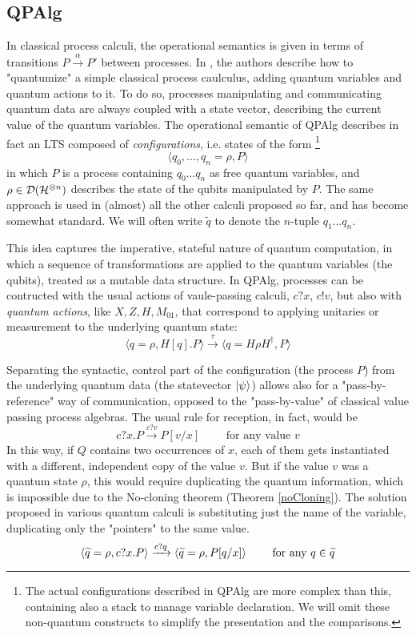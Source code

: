 \subsection{QPAlg}

In classical process calculi, the operational semantics is given in terms of transitions $P \xrightarrow{\alpha} P'$ between processes. In \cite{lalireProcessAlgebraicApproach2004}, the authors describe how to "quantumize" a simple classical process caulculus, adding quantum variables and quantum actions to it. To do so, processes manipulating and communicating quantum data are always coupled with a state vector, describing the current value of the quantum variables. The operational semantic of QPAlg describes in fact an LTS composed of \textit{configurations}, i.e. states of the form \footnote{The actual configurations described in QPAlg are more complex than this, containing also a stack to manage variable declaration. We will omit these non-quantum constructs to simplify the presentation and the comparisons.}
\[
	\langle q_0, \ldots, q_n = \rho, P\rangle
\] 
in which $P$ is a process containing $q_0 \ldots q_n$ as free quantum variables, and $\rho \in \mathcal{D}(\mathcal{H}^{\otimes n})$  describes the state of the qubits manipulated by $P$. The same approach is used in (almost) all the other calculi proposed so far, and has become somewhat standard. We will often write $\widetilde{q}$ to denote the $n$-tuple $q_1 \ldots q_n$. 

This idea captures the imperative, stateful nature of quantum computation, in which a sequence of transformations are applied to the quantum variables (the qubits), treated as a mutable data structure.
In QPAlg, processes can be contructed with the usual actions of vaule-passing calculi, $c?x$, $c!v$, but also with \textit{quantum actions}, like $X, Z, H, M_{01}$, that correspond to applying unitaries or measurement to the underlying quantum state: \[ \langle q = \rho, H[q].P \rangle \xrightarrow{\tau} \langle q = H\rho H^\dagger, P \rangle\]

Separating the syntactic, control part of the configuration (the process $P$) from the underlying quantum data (the statevector $\ket{\psi}$) allows also for a "pass-by-reference" way of communication, opposed to the "pass-by-value" of classical value passing process algebras.
The usual rule for reception, in fact, would be
\[ c?x.P \xrightarrow{c?v} P[v/x]  \qquad \text{ for any value } v
\]
In this way, if $Q$ contains two occurrences of $x$, each of them gets instantiated with a different, independent copy of the value $v$. But if the value $v$ was a quantum state $\rho$, this would require duplicating the quantum information, which is impossible due to the No-cloning theorem (Theorem \ref{noCloning}). The solution proposed in various quantum calculi is substituting just the name of the variable, duplicating only the "pointers" to the same value.
\[ \langle \widetilde{q} = \rho, c?x.P \rangle \xrightarrow{c?q} \langle\widetilde{q} = \rho, P[q/x]\rangle \qquad \text{ for any } q \in \widetilde{q}
\]

